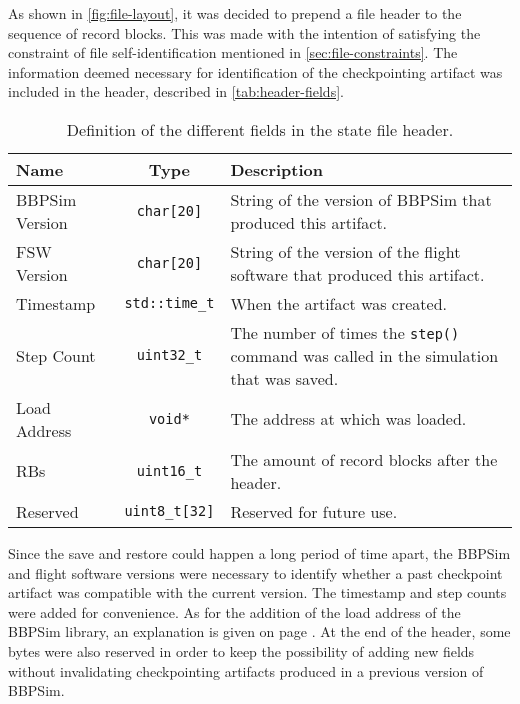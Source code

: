 {As shown in \autoref{fig:file-layout}, it was decided to prepend a file header to the sequence of record blocks. This was made with the intention of satisfying the constraint of file self-identification mentioned in \autoref{sec:file-constraints}. The information deemed necessary for identification of the checkpointing artifact was included in the header, described in \autoref{tab:header-fields}.
\begin{table}[H]
	\vspace{12pt}
	\centering
	\begin{tabularx}{\linewidth}{l c X}
		\toprule
		{\bfseries Name}&{\bfseries \Cpp Type}&{\bfseries Description}\\
		\midrule
		BBPSim Version & \texttt{char[20]} & String of the version of BBPSim that produced this artifact.\\
		\midrule
		FSW Version & \texttt{char[20]} & String of the version of the flight software that produced this artifact.\\
		\midrule
		Timestamp & \texttt{std::time_t} & When the artifact was created.\\
		\midrule
		Step Count & \texttt{uint32_t} & The number of times the \texttt{step()} command was called in the simulation that was saved.\\
		\midrule
		Load Address & \texttt{void*} & The address at which \pathmono{libBbpSim.so} was loaded.\\
		\midrule
		RBs & \texttt{uint16_t} & The amount of record blocks after the header.\\
		\midrule
		Reserved & \texttt{uint8_t[32]} & Reserved for future use.\\
		\bottomrule	
	\end{tabularx}
	\caption{Definition of the different fields in the state file header.}
	\label{tab:header-fields}
\end{table}

Since the save and restore could happen a long period of time apart, the BBPSim and flight software versions were necessary to identify whether a past checkpoint artifact was compatible with the current version. The timestamp and step counts were added for convenience. As for the addition of the load address of the BBPSim library, an explanation is given on page \pageref{subsec:shared-obj-considerations}. At the end of the header, some bytes were also reserved in order to keep the possibility of adding new fields without invalidating checkpointing artifacts produced in a previous version of BBPSim.
}